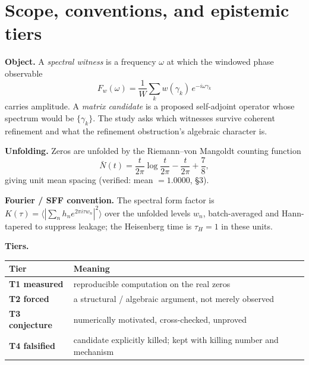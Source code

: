 \documentclass[11pt]{article}
\begin{document}
\begin{abstract}
($\sim\!11{,}500\sigma$ and $\sim\!97\sigma$ from the marginal-matched null) while spacing, counting and shape are FORM ($0.4$--$1.0\sigma$), and the function signal \emph{amplifies} with $N$. Nothing here proves RH, constructs a Hilbert--P\'olya operator, or proves the vanishing of off-line artifacts. Results are tiered by epistemic status; negatives are reported as first-class.
\end{abstract}

\section{Scope, conventions, and epistemic tiers}

\textbf{Object.} A \emph{spectral witness} is a frequency $\omega$ at which the windowed phase observable
\[
F_w(\omega)=\frac{1}{W}\sum_k w(\gamma_k)\,e^{-i\omega\gamma_k}
\]
carries amplitude. A \emph{matrix candidate} is a proposed self-adjoint operator whose spectrum would be $\{\gamma_k\}$. The study asks which witnesses survive coherent refinement and what the refinement obstruction's algebraic character is.

\textbf{Unfolding.} Zeros are unfolded by the Riemann--von Mangoldt counting function
\[
\bar N(t)=\frac{t}{2\pi}\log\frac{t}{2\pi}-\frac{t}{2\pi}+\frac{7}{8},
\]
giving unit mean spacing (verified: mean $=1.0000$, \S3).

\textbf{Fourier / SFF convention.} The spectral form factor is $K(\tau)=\big\langle|\sum_n h_n e^{2\pi i\tau w_n}|^2\big\rangle$ over the unfolded levels $w_n$, batch-averaged and Hann-tapered to suppress leakage; the Heisenberg time is $\tau_H=1$ in these units.

\textbf{Tiers.}
\begin{center}
\begin{tabular}{ll}
\toprule
Tier & Meaning \\
\midrule
\textbf{T1 measured} & reproducible computation on the real zeros \\
\textbf{T2 forced} & a structural / algebraic argument, not merely observed \\
\textbf{T3 conjecture} & numerically motivated, cross-checked, unproved \\
\textbf{T4 falsified} & candidate explicitly killed; kept with killing number and mechanism \\
\bottomrule
\end{tabular}
\end{center}
\end{document}
